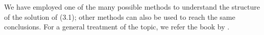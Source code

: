 \documentclass[12pt]{report}   %
\newcommand{\Ndg}{\tilde{N}_g}
\begin{document}
% 
% 
We have employed one of the many possible methods to understand the structure of the solution of (3.1); other methods can also be used to reach the same conclusions.
For a general treatment of the topic, we refer the book by \cite{Hinch1991}. %

%
\clearpage{\pagestyle{empty}\cleardoublepage}

%

\nocite{*}

\begin{spacing}{0.9}
  
\end{spacing}
\end{document}
